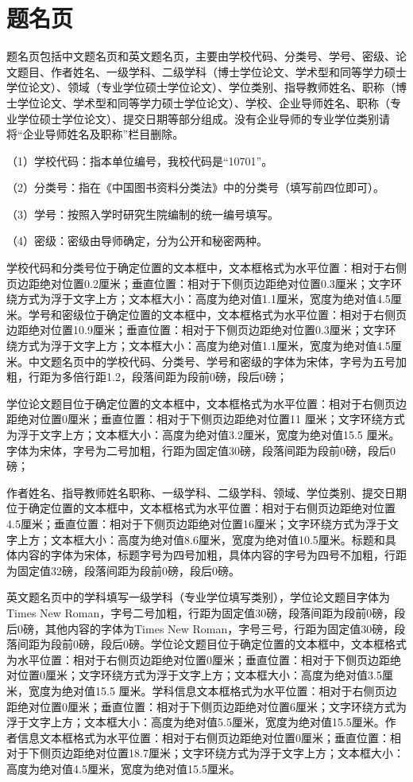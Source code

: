 \section{题名页}
题名页包括中文题名页和英文题名页，主要由学校代码、分类号、学号、密级、论文题目、作者姓名、一级学科、二级学科（博士学位论文、学术型和同等学力硕士学位论文）、领域（专业学位硕士学位论文）、学位类别、指导教师姓名、职称（博士学位论文、学术型和同等学力硕士学位论文）、学校、企业导师姓名、职称（专业学位硕士学位论文）、提交日期等部分组成。没有企业导师的专业学位类别请将“企业导师姓名及职称”栏目删除。
\par
（1）学校代码：指本单位编号，我校代码是“10701”。
\par
（2）分类号：指在《中国图书资料分类法》中的分类号（填写前四位即可）。
\par
（3）学号：按照入学时研究生院编制的统一编号填写。
\par
（4）密级：密级由导师确定，分为公开和秘密两种。
\par
学校代码和分类号位于确定位置的文本框中，文本框格式为水平位置：相对于右侧页边距绝对位置0.2厘米；垂直位置：相对于下侧页边距绝对位置0.3厘米；文字环绕方式为浮于文字上方；文本框大小：高度为绝对值1.1厘米，宽度为绝对值4.5厘米。学号和密级位于确定位置的文本框中，文本框格式为水平位置：相对于右侧页边距绝对位置10.9厘米；垂直位置：相对于下侧页边距绝对位置0.3厘米；文字环绕方式为浮于文字上方；文本框大小：高度为绝对值1.1厘米，宽度为绝对值4.5厘米。中文题名页中的学校代码、分类号、学号和密级的字体为宋体，字号为五号加粗，行距为多倍行距1.2，段落间距为段前0磅，段后0磅；
\par
学位论文题目位于确定位置的文本框中，文本框格式为水平位置：相对于右侧页边距绝对位置0厘米；垂直位置：相对于下侧页边距绝对位置11 厘米；文字环绕方式为浮于文字上方；文本框大小：高度为绝对值3.2厘米，宽度为绝对值15.5 厘米。字体为宋体，字号为二号加粗，行距为固定值30磅，段落间距为段前0磅，段后0磅；
\par
作者姓名、指导教师姓名职称、一级学科、二级学科、领域、学位类别、提交日期位于确定位置的文本框中，文本框格式为水平位置：相对于右侧页边距绝对位置4.5厘米；垂直位置：相对于下侧页边距绝对位置16厘米；文字环绕方式为浮于文字上方；文本框大小：高度为绝对值8.6厘米，宽度为绝对值10.5厘米。标题和具体内容的字体为宋体，标题字号为四号加粗，具体内容的字号为四号不加粗，行距为固定值32磅，段落间距为段前0磅，段后0磅。
\par
英文题名页中的学科填写一级学科（专业学位填写类别），学位论文题目字体为Times New Roman，字号二号加粗，行距为固定值30磅，段落间距为段前0磅，段后0磅，其他内容的字体为Times New Roman，字号三号，行距为固定值30磅，段落间距为段前0磅，段后0磅。学位论文题目位于确定位置的文本框中，文本框格式为水平位置：相对于右侧页边距绝对位置0厘米；垂直位置：相对于下侧页边距绝对位置0厘米；文字环绕方式为浮于文字上方；文本框大小：高度为绝对值3.5厘米，宽度为绝对值15.5 厘米。学科信息文本框格式为水平位置：相对于右侧页边距绝对位置0厘米；垂直位置：相对于下侧页边距绝对位置6厘米；文字环绕方式为浮于文字上方；文本框大小：高度为绝对值5.5厘米，宽度为绝对值15.5厘米。作者信息文本框格式为水平位置：相对于右侧页边距绝对位置0厘米；垂直位置：相对于下侧页边距绝对位置18.7厘米；文字环绕方式为浮于文字上方；文本框大小：高度为绝对值4.5厘米，宽度为绝对值15.5厘米。

